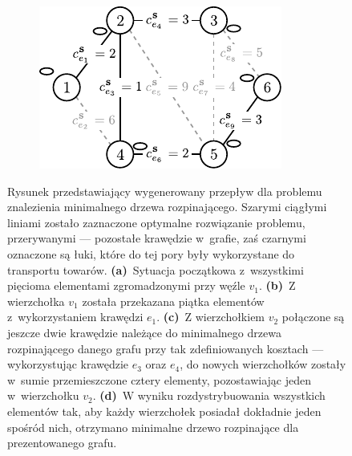 \begin{figure}[!htbp]
\begin{subfigure}[b]{0.242\textwidth}
		\caption{}
		\label{fig:mst2Example:c}
	\end{subfigure}
	\hfill
	\begin{subfigure}[b]{0.242\textwidth}
		\includegraphics[width=\textwidth]{Chapter_III/MST2-example/d}
		\caption{}
		\label{fig:mst2Example:d}
	\end{subfigure}
	\hfill\null
	\caption{
		Rysunek przedstawiający wygenerowany przepływ dla problemu znalezienia minimalnego drzewa rozpinającego.
		Szarymi ciągłymi liniami zostało zaznaczone optymalne rozwiązanie problemu, przerywanymi --- pozostałe krawędzie w~grafie, zaś czarnymi oznaczone są łuki, które do tej pory były wykorzystane do transportu towarów.
		\textbf{(a)}~Sytuacja początkowa z~wszystkimi pięcioma elementami zgromadzonymi przy węźle $v_{1}$.
		\textbf{(b)}~Z wierzchołka $v_{1}$ została przekazana piątka elementów z~wykorzystaniem krawędzi $e_{1}$.
		\textbf{(c)}~Z wierzchołkiem $v_{2}$ połączone są jeszcze dwie krawędzie należące do minimalnego drzewa rozpinającego danego grafu przy tak zdefiniowanych kosztach --- wykorzystując krawędzie $e_{3}$ oraz $e_{4}$, do nowych wierzchołków zostały w~sumie przemieszczone cztery elementy, pozostawiając jeden w~wierzchołku $v_{2}$.
		\textbf{(d)}~W wyniku rozdystrybuowania wszystkich elementów tak, aby każdy wierzchołek posiadał dokładnie jeden spośród nich, otrzymano minimalne drzewo rozpinające dla prezentowanego grafu. 
	}
	\label{fig:mst2Example}
\end{figure}

